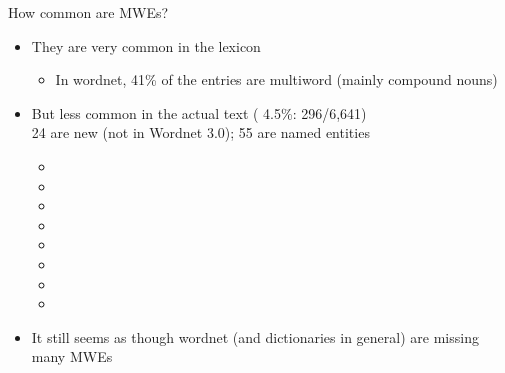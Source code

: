 \begin{frame}{How common are MWEs?}

\begin{itemize}
\item They are very common in the lexicon
  \begin{itemize}
  \item In wordnet,  41\% of the entries are multiword (mainly compound nouns)
  \end{itemize}
\item But less common in the actual text ( 4.5\%: 296/6,641)
\\ 24 are new (not in Wordnet 3.0); 55 are named entities




  \begin{itemize}
  \item {}
  \item {}
  \item {}
  \item {}
  \item {}
  \item {}
  \item {}
  \item {} 
  \end{itemize}
\item It still seems as though wordnet (and dictionaries in general) are missing many MWEs
\end{itemize}

\end{frame}

